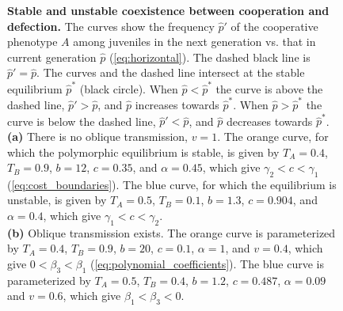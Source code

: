 \documentclass[12pt]{extarticle}
\begin{document}
{\begin{figure}[h]
  \caption{\textbf{Stable and unstable coexistence between cooperation and defection.}
  The curves show the frequency $\hat{p}'$ of the cooperative phenotype $A$ among juveniles in the next generation vs. that in current generation $\hat{p}$ (\autoref{eq:horizontal}).
  The dashed black line is $\hat{p}'=\hat{p}$.
  The curves and the dashed line intersect at the stable equilibrium $\hat{p}^*$ (black circle).
  When $\hat{p} < \hat{p}^*$ the curve is above the dashed line, $\hat{p}' > \hat{p}$, and $\hat{p}$ increases towards $\hat{p}^*$.
  When $\hat{p} > \hat{p}^*$ the curve is below the dashed line, $\hat{p}' < \hat{p}$, and $\hat{p}$ decreases towards $\hat{p}^*$.\\
  \textbf{(a)} There is no oblique transmission, $v=1$.
  The orange curve, for which the polymorphic equilibrium is stable, is given by $T_A = 0.4$, $T_B = 0.9$, $b = 12$, $c=0.35$, and $\alpha = 0.45$, which give $\gamma_2<c<\gamma_1$ (\autoref{eq:cost_boundaries}).
  The blue curve, for which the equilibrium is unstable, is given by $T_A = 0.5$, $T_B = 0.1$, $b = 1.3$, $c=0.904$, and $\alpha = 0.4$, which give $\gamma_1<c<\gamma_2$.\\
  \textbf{(b)} Oblique transmission exists. 
  The orange curve is parameterized by $T_A = 0.4$, $T_B = 0.9$, $b = 20$, $c=0.1$, $\alpha = 1$, and $v=0.4$, which give $0<\beta_3<\beta_1$ (\autoref{eq:polynomial_coefficients}).
  The blue curve is parameterized by $T_A = 0.5$, $T_B = 0.4$, $b=1.2$, $c=0.487$, $\alpha = 0.09$ and $v=0.6$, which give $\beta_1<\beta_3<0$.
  }
  \label{fig:coexistence_recursive}
  \end{figure}



}
\end{document}
